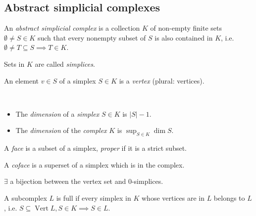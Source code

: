 \begin{multicols*}{3}
\section{Abstract simplicial complexes}
\begin{definition}
An \emph{abstract simplicial complex} is a collection $K$ of non-empty finite sets $\emptyset \neq S \in K$ such that every nonempty subset of $S$ is also contained in $K$, i.e. $\emptyset \neq T \subseteq S \implies T \in K$.
\end{definition}
\rspace
\begin{definition}[Simplex]
Sets in $K$ are called \emph{simplices}.
\end{definition}
\rspace
\begin{definition}[Vertex]
An element $v\in S$ of a simplex $S\in K$ is a \emph{vertex} (plural: vertices).
\end{definition}
\rspace
\begin{defi}\ 
\begin{itemize}[itemsep=-2pt]
\item \vspace{-2pt} The \emph{dimension} of a \emph{simplex} $S\in K$ is $ |S| -1$.  
\item The \emph{dimension} of the \emph{complex} $K$ is $\sup_{S\in K}\dim S$. 
\end{itemize}
\end{defi}
\rspace
\begin{defi}[Face]
A \emph{face} is a subset of a simplex, \emph{proper} if it is a strict subset.
\end{defi}
\rspace
\begin{defi}[Coface]
A \emph{coface} is a superset of a simplex which is in the complex.
\end{defi}
\rspace
\begin{rem}
$\exists$ a bijection between the vertex set and 0-simplices.
\end{rem}
\rspace
\begin{defi}
A subcomplex $L$ is full if every simplex in $K$ whose vertices are in $L$ belongs to $L$, i.e. $S\subseteq \operatorname{Vert}L, S\in K \implies S\in L$.
\end{defi}
\rspace
\drawaline
\vspace{-0.4pc}

\end{multicols*}
